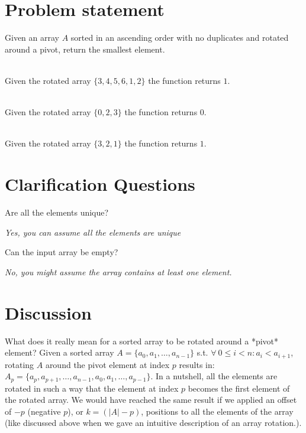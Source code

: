 \section{Problem statement}
\begin{exercise}
Given an array $A$ sorted in an ascending order with no duplicates and rotated around a pivot, return the smallest element.

	\begin{example}
		\hfill \\
		Given the rotated array $\{3,4,5,6,1,2\}$ the function returns $1$.
	\end{example}

	\begin{example}
		\hfill \\
		Given the rotated array $\{0,2,3\}$ the function returns $0$.
	\end{example}

	\begin{example}
		\hfill \\
		Given the rotated array $\{3,2,1\}$ the function returns $1$.
	\end{example}
\end{exercise}

\section{Clarification Questions}

\begin{QandA}
	\item Are all the elements unique? 
	\begin{answered}
		\textit{Yes, you can assume all the elements are unique}
	\end{answered}
	\item Can the input array be empty?
	\begin{answered}
		\textit{No, you might assume the array contains at least one element.}
	\end{answered}
\end{QandA}

\section{Discussion}
\label{min_rotated_array:sec:discussion}
What does it really mean for a sorted array to be rotated around a *pivot* element? Given a sorted array $A=\{a_0, a_1, \ldots,a_{n-1}\}$ s.t. $\forall \: 0 \leq i < n: a_i < a_{i+1}$, rotating $A$ around the pivot element at index $p$ results in: $A_p=\{a_p, a_{p+1}, \ldots,a_{n-1}, a_0, a_1, \ldots, a_{p-1}\}$. 
In a nutshell, all the elements are rotated in such a way that the element at index $p$ becomes the first element of the rotated array. We would have reached the same result if we applied an offset of $-p$ (negative $p$), or $k=(|A|-p)$, positions to all the elements of the array (like discussed above when we gave an intuitive description of an array rotation.). 

